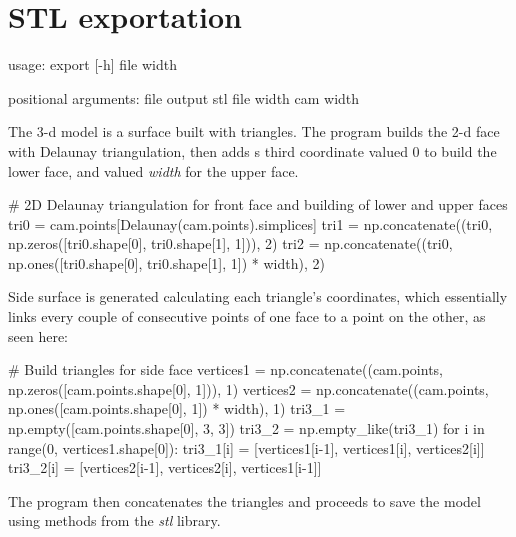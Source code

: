 \documentclass[a4paper,10pt,twoside]{article}
\renewenvironment{verbatim}{\begin{minipage}{\linewidth}\begin{oldverbatim}}{\end{oldverbatim}\end{minipage}}
\begin{document}
\section{STL exportation}
    \begin{verbatim}
    usage:  export [-h] file width

    positional arguments:
      file        output stl file
      width       cam width
    \end{verbatim}

    The 3-d model is a surface built with triangles. The program builds the 2-d face with Delaunay triangulation,
    then adds s third coordinate valued 0 to build the lower face, and valued \emph{width} for the upper face.
    \begin{pycode}
    # 2D Delaunay triangulation for front face and building of lower and upper faces
    tri0 = cam.points[Delaunay(cam.points).simplices]
    tri1 = np.concatenate((tri0, np.zeros([tri0.shape[0], tri0.shape[1], 1])), 2)
    tri2 = np.concatenate((tri0, np.ones([tri0.shape[0], tri0.shape[1], 1]) * width), 2)
    \end{pycode}

    Side surface is generated calculating each triangle's coordinates, which essentially links every couple of
    consecutive points of one face to a point on the other, as seen here:
    \begin{pycode}
    # Build triangles for side face
    vertices1 = np.concatenate((cam.points, np.zeros([cam.points.shape[0], 1])), 1)
    vertices2 = np.concatenate((cam.points, np.ones([cam.points.shape[0], 1]) * width), 1)
    tri3_1 = np.empty([cam.points.shape[0], 3, 3])
    tri3_2 = np.empty_like(tri3_1)
    for i in range(0, vertices1.shape[0]):
        tri3_1[i] = [vertices1[i-1], vertices1[i], vertices2[i]]
        tri3_2[i] = [vertices2[i-1], vertices2[i], vertices1[i-1]]
    \end{pycode}

    The program then concatenates the triangles and proceeds to save the model using methods from the \emph{stl} library.
\end{document}
